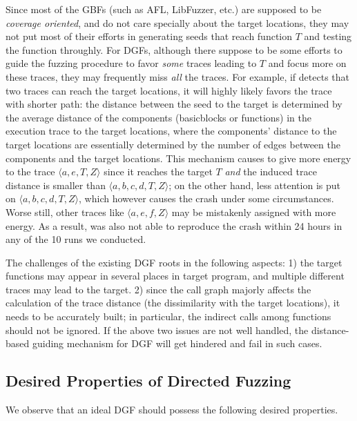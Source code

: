Since most of the GBFs (such as AFL, LibFuzzer, etc.) are supposed to be \emph{coverage oriented}, and do not care specially about the target locations, they may not put most of their efforts in generating seeds that reach function $T$ and testing the function throughly. For DGFs, although there suppose to be some efforts to guide the fuzzing procedure to favor \emph{some} traces leading to $T$ and focus more on these traces, they may frequently miss \emph{all} the traces. For example, if \aflgo detects that two traces can reach the target locations, it will highly likely favors the trace with shorter path: the distance between the seed to the target is determined by the average distance of the components (basicblocks or functions) in the execution trace to the target locations, where the components' distance to the target locations are essentially determined by the number of edges between the components and the target locations. This mechanism causes \aflgo to give more energy to the trace $\langle a, e, T, Z\rangle$ since it reaches the target $T$ \emph{and} the induced trace distance is smaller than $\langle a, b, c, d, T, Z\rangle$; on the other hand, less attention is put on $\langle a, b, c, d, T, Z\rangle$, which however causes the crash under some circumstances. Worse still, other traces like $\langle a, e, f, Z\rangle$ may be mistakenly assigned with more energy. As a result, \aflgo was also not able to reproduce the crash within 24 hours in any of the 10 runs we conducted.
 
The challenges of the existing DGF roots in the following aspects: 1) the target functions may appear in several places in target program, and multiple different traces may lead to the target.  2) since the call graph majorly affects the calculation of the trace distance (the dissimilarity with the target locations), it needs to be accurately built;
in particular, the indirect calls among functions should not be ignored. If the above two issues are not well handled, the distance-based guiding mechanism for DGF will get hindered and fail in such cases.


\subsection{Desired Properties of Directed Fuzzing} \label{subsec:dp}

We observe that an ideal DGF should possess the following desired properties.


